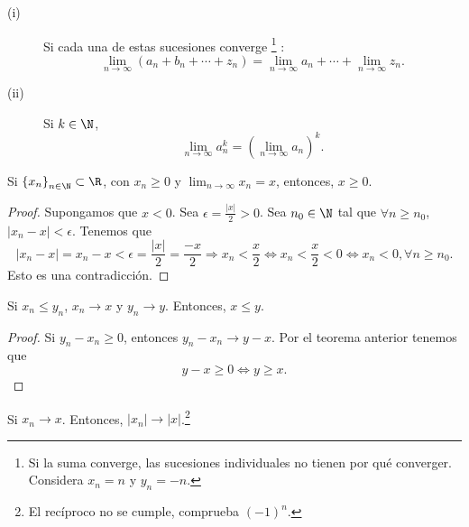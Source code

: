 \begin{fcolorary}[]
\normalfont 
\begin{description}
\item[(i)] Si cada una de estas sucesiones converge \footnote{Si la suma converge, las sucesiones individuales no tienen por qué converger. Considera $\displaystyle x_{n} = n $ y $\displaystyle y _{n} = -n $.} :
	\[\lim_{n \to \infty}\left(a_{n} + b_{n} + \cdots + z_{n}\right) = \lim_{n \to \infty}a_{n} + \cdots + \lim_{n \to \infty}z_{n} .\]
\item[(ii)] Si $\displaystyle k\in \N $,
	\[\lim_{n \to \infty} a_{n}^{k} = \left(\lim_{n \to \infty}a_{n}\right)^{k} .\]
\end{description}
\end{fcolorary}

\begin{ftheorem}[]
	\normalfont Si $\displaystyle \left\{ x_{n}\right\} _{n\in\N}\subset\R $, con $\displaystyle x_{n}\geq 0 $ y $\displaystyle \lim_{n \to \infty}x_{n} = x $, entonces, $\displaystyle x \geq 0 $. 
\end{ftheorem}

\begin{proof}
Supongamos que $\displaystyle x < 0 $. Sea $\displaystyle \epsilon = \frac{ \left|x\right|}{2} > 0 $. Sea $\displaystyle n_{0}\in\N $ tal que $\displaystyle \forall n \geq n_{0} $, $\displaystyle \left|x_{n}-x\right| < \epsilon  $.
Tenemos que
\[ \left|x_{n}-x\right| = x_{n}-x<\epsilon = \frac{ \left|x\right|}{2} = \frac{-x}{2} \Rightarrow x_{n} < \frac{x}{2} \iff x_{n}<\frac{x}{2} < 0 \iff x_{n} < 0, \forall n \geq n_{0} .\]
 Esto es una contradicción.
\end{proof}

\begin{fcolorary}[]
\normalfont Si $\displaystyle x_{n} \leq y_{n} $, $\displaystyle x_{n} \to x $ y $\displaystyle y_{n} \to y $. Entonces, $\displaystyle x \leq y $.
\end{fcolorary}

\begin{proof}
Si $\displaystyle y_{n}-x_{n}\geq 0 $, entonces $\displaystyle y_{n}-x_{n} \to y-x $. Por el teorema anterior tenemos que 
\[y - x \geq 0 \iff y \geq x .\]
\end{proof}

\begin{fcolorary}[]
\normalfont Si $\displaystyle x_{n}\to x $. Entonces, $\displaystyle \left|x_{n}\right|\to \left|x\right| $.\footnote{El recíproco no se cumple, comprueba $\displaystyle \left(-1\right)^{n} $.} 

\end{fcolorary}

